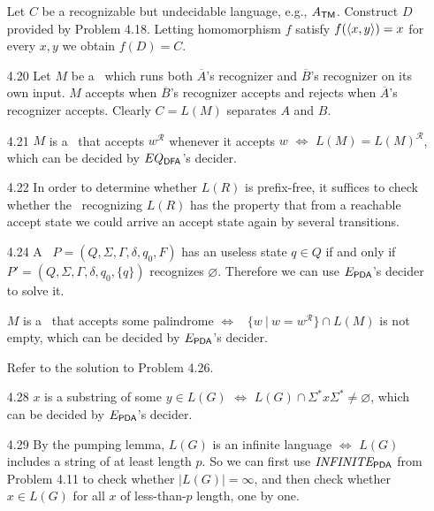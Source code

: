 \begin{itemize}
	\item[\Star 4.19]
	Let $C$ be a recognizable but undecidable language, e.g., $A_{\TM}$. Construct $D$ provided by Problem 4.18. Letting homomorphism $f$ satisfy $f(\Bra{x,y}) = x$ for every $x,y$ we obtain $f(D) = C$.
	
	\item[4.20]
	Let $M$ be a \TM \ which runs both $\overline{A}$'s recognizer and $\overline{B}$'s recognizer on its own input. $M$ accepts when $\overline{B}$'s recognizer accepts and rejects when $\overline{A}$'s recognizer accepts. Clearly $C = L(M)$ separates $A$ and $B$.
	
	\item[4.21]
	$M$ is a \DFA \ that accepts $w^\mathcal{R}$ whenever it accepts $w$ $\iff$ $L(M) = L(M)^\mathcal{R}$, which can be decided by $EQ_{\DFA}$'s decider.
	
	\item[4.22]
	In order to determine whether $L(R)$ is prefix-free, it suffices to check whether the \DFA \ recognizing $L(R)$ has the property that from a reachable accept state we could arrive an accept state again by several transitions.
	
	\item[\Star 4.23]
	\Omit
	
	\item[4.24]
	A \PDA \ $P = (Q, \Sigma, \Gamma, \delta, q_0, F)$ has an useless state $q \in Q$ if and only if \PDA \ $P' = (Q, \Sigma, \Gamma, \delta, q_0, \{q\})$ recognizes $\varnothing$. Therefore we can use $E_{\PDA}$'s decider to solve it.
	
	\item[\Star 4.25]
	\Omit
	
	\item[\Star 4.26] 
	$M$ is a \DFA \ that accepts some palindrome $\iff$ \CFL \ $\{ w \ | \ w = w^{\mathcal{R}} \} \cap L(M)$ is not empty, which can be decided by $E_{\PDA}$'s decider.
	
	\item[\Star 4.27] 
	Refer to the solution to Problem 4.26.
	
	\item[4.28]
	$x$ is a substring of some $y \in L(G)$ $\iff$ $L(G) \cap \Sigma^* x \Sigma^* \neq \varnothing$, which can be decided by $E_{\PDA}$'s decider.
	
	\item[4.29]
	By the pumping lemma, $L(G)$ is an infinite language $\iff$ $L(G)$ includes a string of at least length $p$. So we can first use $\IT{INFINITE}_{\PDA}$ from Problem 4.11 to check whether $|L(G)| = \infty$, and then check whether $x \in L(G)$ for all $x$ of less-than-$p$ length, one by one.
	

\end{itemize}
